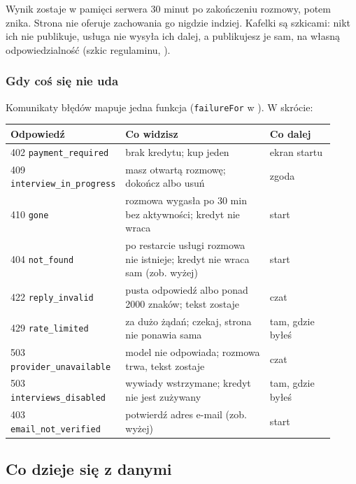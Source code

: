 {Wynik zostaje w pamięci serwera 30 minut po zakończeniu rozmowy, potem znika.
Strona nie oferuje zachowania go nigdzie indziej. Kafelki są szkicami: nikt ich
nie publikuje, usługa nie wysyła ich dalej, a publikujesz je sam, na własną
odpowiedzialność (szkic regulaminu, ).

\subsubsection{Gdy coś się nie uda}

Komunikaty błędów mapuje jedna funkcja (\texttt{failureFor} w
). W skrócie:

\begin{longtable}{@{}p{0.2\linewidth}p{0.5\linewidth}p{0.22\linewidth}@{}}
\toprule
Odpowiedź & Co widzisz & Co dalej \\
\midrule
\endhead
402 \texttt{payment\_\allowbreak{}required} & brak kredytu; kup jeden & ekran startu \\
409 \texttt{interview\_\allowbreak{}in\_\allowbreak{}progress} & masz otwartą rozmowę; dokończ albo usuń & zgoda \\
410 \texttt{gone} & rozmowa wygasła po 30 min bez aktywności; kredyt nie wraca & start \\
404 \texttt{not\_found} & po restarcie usługi rozmowa nie istnieje; kredyt nie wraca sam (zob. wyżej) & start \\
422 \texttt{reply\_\allowbreak{}invalid} & pusta odpowiedź albo ponad 2000 znaków; tekst zostaje & czat \\
429 \texttt{rate\_\allowbreak{}limited} & za dużo żądań; czekaj, strona nie ponawia sama & tam, gdzie byłeś \\
503 \texttt{provider\_\allowbreak{}unavailable} & model nie odpowiada; rozmowa trwa, tekst zostaje & czat \\
503 \texttt{interviews\_\allowbreak{}disabled} & wywiady wstrzymane; kredyt nie jest zużywany & tam, gdzie byłeś \\
403 \texttt{email\_\allowbreak{}not\_\allowbreak{}verified} & potwierdź adres e-mail (zob. wyżej) & start \\
\bottomrule
\end{longtable}

\subsection{Co dzieje się z danymi}

}
